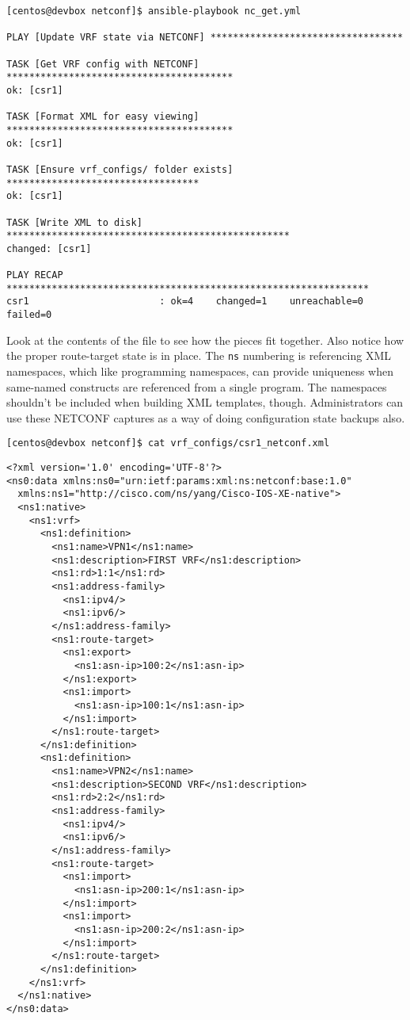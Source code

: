 \begin{verbatim}
[centos@devbox netconf]$ ansible-playbook nc_get.yml

PLAY [Update VRF state via NETCONF] **********************************

TASK [Get VRF config with NETCONF] ****************************************
ok: [csr1]

TASK [Format XML for easy viewing] ****************************************
ok: [csr1]

TASK [Ensure vrf_configs/ folder exists] **********************************
ok: [csr1]

TASK [Write XML to disk] **************************************************
changed: [csr1]

PLAY RECAP ****************************************************************
csr1                       : ok=4    changed=1    unreachable=0    failed=0
\end{verbatim}

Look at the contents of the file to see how the pieces fit together. Also notice
how the proper route-target state is in place. The \verb|ns| numbering is
referencing XML namespaces, which like programming namespaces, can provide uniqueness
when same-named constructs are referenced from a single program. The namespaces
shouldn't be included when building XML templates, though. Administrators
can use these NETCONF captures as a way of doing configuration state
backups also.

\begin{verbatim}
[centos@devbox netconf]$ cat vrf_configs/csr1_netconf.xml
\end{verbatim}

\begin{verbatim}
<?xml version='1.0' encoding='UTF-8'?>
<ns0:data xmlns:ns0="urn:ietf:params:xml:ns:netconf:base:1.0"
  xmlns:ns1="http://cisco.com/ns/yang/Cisco-IOS-XE-native">
  <ns1:native>
    <ns1:vrf>
      <ns1:definition>
        <ns1:name>VPN1</ns1:name>
        <ns1:description>FIRST VRF</ns1:description>
        <ns1:rd>1:1</ns1:rd>
        <ns1:address-family>
          <ns1:ipv4/>
          <ns1:ipv6/>
        </ns1:address-family>
        <ns1:route-target>
          <ns1:export>
            <ns1:asn-ip>100:2</ns1:asn-ip>
          </ns1:export>
          <ns1:import>
            <ns1:asn-ip>100:1</ns1:asn-ip>
          </ns1:import>
        </ns1:route-target>
      </ns1:definition>
      <ns1:definition>
        <ns1:name>VPN2</ns1:name>
        <ns1:description>SECOND VRF</ns1:description>
        <ns1:rd>2:2</ns1:rd>
        <ns1:address-family>
          <ns1:ipv4/>
          <ns1:ipv6/>
        </ns1:address-family>
        <ns1:route-target>
          <ns1:import>
            <ns1:asn-ip>200:1</ns1:asn-ip>
          </ns1:import>
          <ns1:import>
            <ns1:asn-ip>200:2</ns1:asn-ip>
          </ns1:import>
        </ns1:route-target>
      </ns1:definition>
    </ns1:vrf>
  </ns1:native>
</ns0:data>
\end{verbatim}

